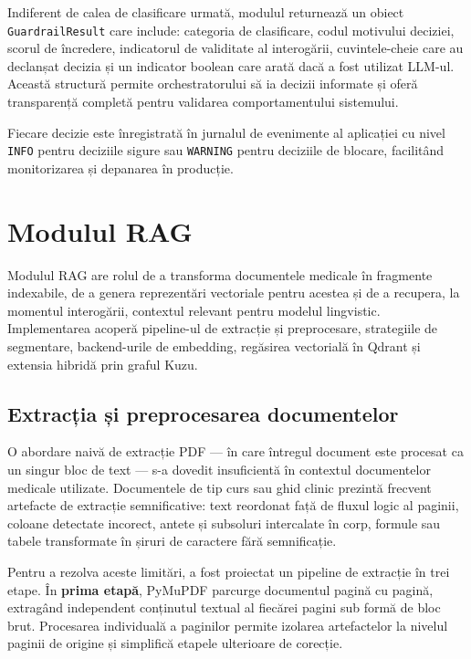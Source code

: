 \documentclass[12pt, a4paper, oneside, romanian]{teza-upb}
\begin{document}
Indiferent de calea de clasificare urmată, modulul returnează un obiect \texttt{GuardrailResult} care include: categoria de clasificare, codul motivului deciziei, scorul de încredere, indicatorul de validitate al interogării, cuvintele-cheie care au declanșat decizia și un indicator boolean care arată dacă a fost utilizat LLM-ul. Această structură permite orchestratorului să ia decizii informate și oferă transparență completă pentru validarea comportamentului sistemului.


Fiecare decizie este înregistrată în jurnalul de evenimente al aplicației cu nivel \texttt{INFO} pentru deciziile sigure sau \texttt{WARNING} pentru deciziile de blocare, facilitând monitorizarea și depanarea în producție.

\section{Modulul RAG}

Modulul RAG are rolul de a transforma documentele medicale în fragmente indexabile, de a genera reprezentări vectoriale pentru acestea și de a recupera, la momentul interogării, contextul relevant pentru modelul lingvistic. Implementarea acoperă pipeline-ul de extracție și preprocesare, strategiile de segmentare, backend-urile de embedding, regăsirea vectorială în Qdrant și extensia hibridă prin graful Kuzu.

\subsection{Extracția și preprocesarea  documentelor}

O abordare naivă de extracție PDF — în care întregul document este procesat ca un singur bloc de text — s-a dovedit insuficientă în contextul documentelor medicale utilizate. Documentele de tip curs sau ghid clinic prezintă frecvent artefacte de extracție semnificative: text reordonat față de fluxul logic al paginii, coloane detectate incorect, antete și subsoluri intercalate în corp, formule sau tabele transformate în șiruri de caractere fără semnificație.

Pentru a rezolva aceste limitări, a fost proiectat un pipeline de extracție în trei etape. În \textbf{prima etapă}, PyMuPDF parcurge documentul pagină cu pagină, extragând independent conținutul textual al fiecărei pagini sub formă de bloc brut. Procesarea individuală a paginilor permite izolarea artefactelor la nivelul paginii de origine și simplifică etapele ulterioare de corecție.
\end{document}
